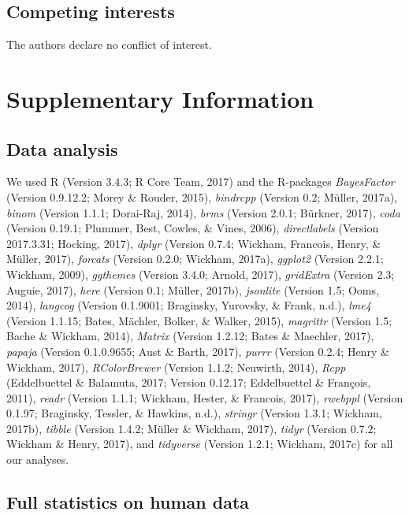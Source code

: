 \documentclass[floatsintext,man]{apa6}
\theoremstyle{definition}
\theoremstyle{definition}
\theoremstyle{definition}
\theoremstyle{remark}
\begin{document}
\subsection{Competing interests}\label{competing-interests}

The authors declare no conflict of interest.

\section{Supplementary Information}\label{supplementary-information}

\subsection{Data analysis}\label{data-analysis}

We used R (Version 3.4.3; R Core Team, 2017) and the R-packages
\emph{BayesFactor} (Version 0.9.12.2; Morey \& Rouder, 2015),
\emph{bindrcpp} (Version 0.2; Müller, 2017a), \emph{binom} (Version
1.1.1; Dorai-Raj, 2014), \emph{brms} (Version 2.0.1; Bürkner, 2017),
\emph{coda} (Version 0.19.1; Plummer, Best, Cowles, \& Vines, 2006),
\emph{directlabels} (Version 2017.3.31; Hocking, 2017), \emph{dplyr}
(Version 0.7.4; Wickham, Francois, Henry, \& Müller, 2017),
\emph{forcats} (Version 0.2.0; Wickham, 2017a), \emph{ggplot2} (Version
2.2.1; Wickham, 2009), \emph{ggthemes} (Version 3.4.0; Arnold, 2017),
\emph{gridExtra} (Version 2.3; Auguie, 2017), \emph{here} (Version 0.1;
Müller, 2017b), \emph{jsonlite} (Version 1.5; Ooms, 2014),
\emph{langcog} (Version 0.1.9001; Braginsky, Yurovsky, \& Frank, n.d.),
\emph{lme4} (Version 1.1.15; Bates, Mächler, Bolker, \& Walker, 2015),
\emph{magrittr} (Version 1.5; Bache \& Wickham, 2014), \emph{Matrix}
(Version 1.2.12; Bates \& Maechler, 2017), \emph{papaja} (Version
0.1.0.9655; Aust \& Barth, 2017), \emph{purrr} (Version 0.2.4; Henry \&
Wickham, 2017), \emph{RColorBrewer} (Version 1.1.2; Neuwirth, 2014),
\emph{Rcpp} (Eddelbuettel \& Balamuta, 2017; Version 0.12.17;
Eddelbuettel \& François, 2011), \emph{readr} (Version 1.1.1; Wickham,
Hester, \& Francois, 2017), \emph{rwebppl} (Version 0.1.97; Braginsky,
Tessler, \& Hawkins, n.d.), \emph{stringr} (Version 1.3.1; Wickham,
2017b), \emph{tibble} (Version 1.4.2; Müller \& Wickham, 2017),
\emph{tidyr} (Version 0.7.2; Wickham \& Henry, 2017), and
\emph{tidyverse} (Version 1.2.1; Wickham, 2017c) for all our analyses.

\subsection{Full statistics on human
data}\label{full-statistics-on-human-data}
\end{document}
